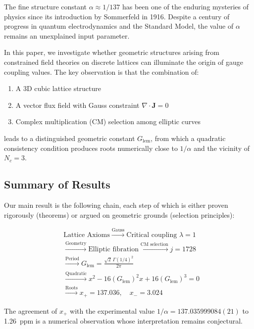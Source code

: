 \documentclass[11pt,a4paper]{article}
\theoremstyle{definition}
\theoremstyle{remark}
\newcommand{\Glem}{G_{\text{lem}}}
\begin{document}
The fine structure constant $\alpha \approx 1/137$ has been one of the enduring mysteries of physics since its introduction by Sommerfeld in 1916. Despite a century of progress in quantum electrodynamics and the Standard Model, the value of $\alpha$ remains an unexplained input parameter.

In this paper, we investigate whether geometric structures arising from constrained field theories on discrete lattices can illuminate the origin of gauge coupling values. The key observation is that the combination of:
\begin{enumerate}
    \item A 3D cubic lattice structure
    \item A vector flux field with Gauss constraint $\nabla \cdot \mathbf{J} = 0$
    \item Complex multiplication (CM) selection among elliptic curves
\end{enumerate}
leads to a distinguished geometric constant $\Glem$, from which a quadratic consistency condition produces roots numerically close to $1/\alpha$ and the vicinity of $N_c = 3$.

\subsection{Summary of Results}

Our main result is the following chain, each step of which is either proven rigorously (theorems) or argued on geometric grounds (selection principles):

\begin{equation}
\boxed{
\begin{aligned}
&\text{Lattice Axioms} \xrightarrow{\text{Gauss}} \text{Critical coupling } \lambda = 1 \\
&\xrightarrow{\text{Geometry}} \text{Elliptic fibration} \xrightarrow{\text{CM selection}} j = 1728 \\
&\xrightarrow{\text{Period}} \Glem = \frac{\sqrt{2}\,\Gamma(1/4)^2}{2\pi} \\
&\xrightarrow{\text{Quadratic}} x^2 - 16(\Glem)^2 x + 16(\Glem)^3 = 0 \\
&\xrightarrow{\text{Roots}} x_+ = 137.036, \quad x_- = 3.024
\end{aligned}
}
\end{equation}

The agreement of $x_+$ with the experimental value $1/\alpha = 137.035999084(21)$ to 1.26~ppm is a numerical observation whose interpretation remains conjectural.
\end{document}
